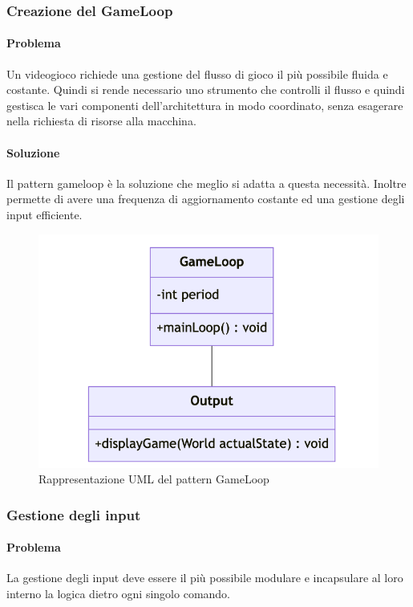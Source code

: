 \documentclass[a4paper,12pt]{report}
\begin{document}
\subsubsection{Creazione del GameLoop}

\paragraph{Problema} Un videogioco richiede una gestione del flusso di gioco il più possibile fluida e costante. Quindi si rende necessario uno strumento che controlli il flusso e quindi gestisca le vari componenti dell'architettura in modo coordinato, senza esagerare nella richiesta di risorse alla macchina.

\paragraph{Soluzione} Il pattern gameloop è la soluzione che meglio si adatta a questa necessità. Inoltre permette di avere una frequenza di aggiornamento costante ed una gestione degli input efficiente.

\begin{figure}[H]
\centering{}
\includegraphics[width=\textwidth]{img/Diagramma_UML_GameLoop}
\caption{Rappresentazione UML del pattern GameLoop}
\label{img:Diagramma_UML_GameLoop}
\end{figure}

\subsubsection{Gestione degli input}

\paragraph{Problema} La gestione degli input deve essere il più possibile modulare e incapsulare al loro interno la logica dietro ogni singolo comando.
\end{document}
